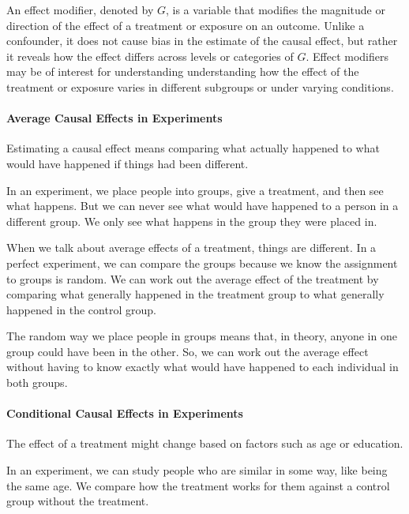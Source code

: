 \documentclass[
  singlecolumn]{article}
\let\oldparagraph\paragraph
\renewcommand{\paragraph}[1]{\oldparagraph{#1}\mbox{}}
\begin{document}
An effect modifier, denoted by \(G\), is a variable that modifies the
magnitude or direction of the effect of a treatment or exposure on an
outcome. Unlike a confounder, it does not cause bias in the estimate of
the causal effect, but rather it reveals how the effect differs across
levels or categories of \(G\). Effect modifiers may be of interest for
understanding understanding how the effect of the treatment or exposure
varies in different subgroups or under varying conditions.

\hypertarget{average-causal-effects-in-experiments}{%
\paragraph{\texorpdfstring{\textbf{Average Causal Effects in
Experiments}}{Average Causal Effects in Experiments}}\label{average-causal-effects-in-experiments}}

Estimating a causal effect means comparing what actually happened to
what would have happened if things had been different.

In an experiment, we place people into groups, give a treatment, and
then see what happens. But we can never see what would have happened to
a person in a different group. We only see what happens in the group
they were placed in.

When we talk about average effects of a treatment, things are different.
In a perfect experiment, we can compare the groups because we know the
assignment to groups is random. We can work out the average effect of
the treatment by comparing what generally happened in the treatment
group to what generally happened in the control group.

The random way we place people in groups means that, in theory, anyone
in one group could have been in the other. So, we can work out the
average effect without having to know exactly what would have happened
to each individual in both groups.

\hypertarget{conditional-causal-effects-in-experiments}{%
\paragraph{\texorpdfstring{\textbf{Conditional Causal Effects in
Experiments}}{Conditional Causal Effects in Experiments}}\label{conditional-causal-effects-in-experiments}}

The effect of a treatment might change based on factors such as age or
education.

In an experiment, we can study people who are similar in some way, like
being the same age. We compare how the treatment works for them against
a control group without the treatment.
\end{document}
